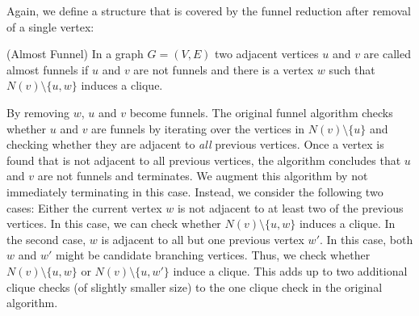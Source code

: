 \documentclass[a4paper,UKenglish,cleveref, autoref, thm-restate]{lipics-v2021}
\begin{document}
Again, we define a structure that is covered by the funnel reduction after
removal of a single vertex:

\begin{definition}(Almost Funnel)
  In a graph $G=(V,E)$ two adjacent vertices $u$ and $v$ are called almost funnels if $u$ and $v$ are not funnels and there is a vertex $w$ such that $N(v)\setminus\{u,w\}$ induces a clique.
\end{definition}

By removing $w$, $u$ and $v$ become funnels. The original funnel algorithm
checks whether $u$ and $v$ are funnels by iterating over the vertices in $N(v) \setminus \{u\}$
and checking whether they are adjacent to \emph{all} previous vertices. Once a vertex
is found that is not adjacent to all previous vertices, the algorithm concludes
that $u$ and $v$ are not funnels and terminates. We augment this algorithm by
not immediately terminating in this case. Instead, we consider the following two
cases: Either the current vertex $w$ is not adjacent to at least two of the
previous vertices. In this case, we can check whether $N(v) \setminus \{u, w\}$
induces a clique. In the second case, $w$ is adjacent to all but one previous
vertex $w'$. In this case, both $w$ and $w'$ might be candidate branching
vertices. Thus, we check whether $N(v) \setminus \{u, w\}$ or $N(v) \setminus
\{u, w'\}$ induce a clique. This adds up to two additional clique checks (of
slightly smaller size) to the one clique check in the original algorithm.




\end{document}

